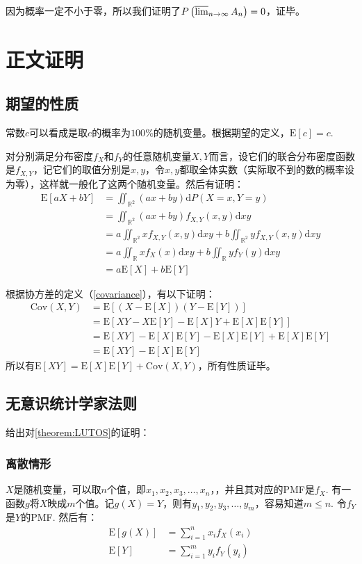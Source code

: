 \documentclass[UTF8]{ctexbook}
\begin{document}
因为概率一定不小于零，所以我们证明了$P\left(\varlimsup_{n\to\infty}A_n\right)=0$，证毕。
\section{正文证明}
\subsection{期望的性质}
\label{mean-proof}
常数$c$可以看成是取$c$的概率为$100\%$的随机变量。根据期望的定义，$\mathrm E[c]=c$.

对分别满足分布密度$f_X$和$f_Y$的任意随机变量$X, Y$而言，设它们的联合分布密度函数是$f_{X,Y}$，记它们的取值分别是$x, y$，令$x, y$都取全体实数（实际取不到的数的概率设为零），这样就一般化了这两个随机变量。然后有证明：
\begin{align*}
	\mathrm E[aX+bY]&=\iint_{\mathbb{R}^2}(ax+by)\mathrm dP(X=x, Y=y) \\
	&=\iint_{\mathbb{R}^2}(ax+by)f_{X,Y}(x,y)\mathrm dxy \\
	&=a\iint_{\mathbb{R}^2}xf_{X,Y}(x,y)\mathrm dxy+b\iint_{\mathbb{R}^2}yf_{X,Y}(x,y)\mathrm dxy \\
	&=a\iint_{\mathbb{R}}xf_{X}(x)\mathrm dxy+b\iint_{\mathbb{R}}yf_{Y}(y)\mathrm dxy \\
	&=a\mathrm E[X]+b\mathrm E[Y]
\end{align*}

根据协方差的定义（\ref{covariance}），有以下证明：
\begin{align*}
	\mathrm{Cov}(X,Y)&=\mathrm E[(X-\mathrm E[X])(Y-\mathrm E[Y])] \\
	&=\mathrm E[XY-X\mathrm E[Y]-\mathrm E[X]Y+\mathrm E[X]\mathrm E[Y]] \\
	&=\mathrm E[XY]-\mathrm E[X]\mathrm E[Y]-\mathrm E[X]\mathrm E[Y]+\mathrm E[X]\mathrm E[Y]\\
	&=\mathrm E[XY]-\mathrm E[X]\mathrm E[Y]
\end{align*}
所以有$\mathrm E[XY]=\mathrm E[X]\mathrm E[Y]+\mathrm{Cov}(X,Y)$，所有性质证毕。
\subsection{无意识统计学家法则}
\label{LUTOS-proof}

给出对\autoref{theorem:LUTOS}的证明：
\subsubsection{离散情形}
$X$是随机变量，可以取$n$个值，即$x_1,x_2,x_3,\dots,x_n$，，并且其对应的PMF是$f_X$. 有一函数$g$将$X$映成$m$个值。记$g(X)=Y$，则有$y_1,y_2,y_3,\dots,y_m$，容易知道$m\leq n$. 令$f_Y$是$Y$的PMF. 然后有：
\begin{align*}
	\mathrm E[g(X)]&=\sum_{i=1}^nx_if_X(x_i) \\
	\mathrm E[Y]&=\sum_{i=1}^my_if_Y(y_i)
\end{align*}
\end{document}
